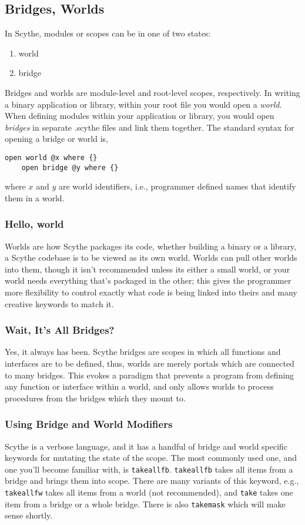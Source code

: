 \documentclass{article}
\begin{document}
\subsection{Bridges, Worlds}
In Scythe, modules or scopes can be in one of two states:
\begin{enumerate}
    \item world
    \item bridge
\end{enumerate}
Bridges and worlds are module-level and root-level scopes, respectively. In writing a binary application or library, within your root file you would open a \emph{world}. When defining modules within your application or library, you would open \emph{bridges} in separate .scythe files and link them together. The standard syntax for opening a bridge or world is,
\begin{lstlisting}[style=scythe_style]
    open world @x where {}
    open bridge @y where {}
\end{lstlisting}
where $x$ and $y$ are world identifiers, i.e., programmer defined names that identify them in a world.
\subsubsection{Hello, world}
Worlds are how Scythe packages its code, whether building a binary or a library, a Scythe codebase is to be viewed as its own world. Worlds can pull other worlds into them, though it isn't recommended unless its either a small world, or your world needs everything that's packaged in the other; this gives the programmer more flexibility to control exactly what code is being linked into theirs and many creative keywords to match it.
\subsubsection{Wait, It's All Bridges?}
Yes, it always has been. Scythe bridges are scopes in which all functions and interfaces are to be defined, thus, worlds are merely portals which are connected to many bridges. This evokes a paradigm that prevents a program from defining any function or interface within a world, and only allows worlds to process procedures from the bridges which they mount to.
\subsubsection{Using Bridge and World Modifiers}
 \indent Scythe is a verbose language, and it has a handful of bridge and world specific keywords for mutating the state of the scope. The most commonly used one, and one you'll become familiar with, is \lstinline[style=scythe_style]{takeallfb}. 
\lstinline[style=scythe_style]{takeallfb} takes all items from a bridge and brings them into scope. There are many variants of this keyword, e.g.,
\lstinline[style=scythe_style]{takeallfw} takes all items from a world (not recommended),
and \lstinline[style=scythe_style]{take} takes one item from a bridge or a whole bridge. There is also \lstinline[style=scythe_style]{takemask} which will make sense shortly.
\end{document}

